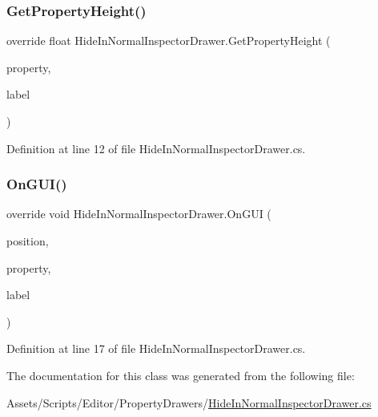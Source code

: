 \subsubsection{\texorpdfstring{Get\+Property\+Height()}{GetPropertyHeight()}}
{\footnotesize\ttfamily override float Hide\+In\+Normal\+Inspector\+Drawer.\+Get\+Property\+Height (\begin{DoxyParamCaption}\item[{Serialized\+Property}]{property,  }\item[{G\+U\+I\+Content}]{label }\end{DoxyParamCaption})}



Definition at line 12 of file Hide\+In\+Normal\+Inspector\+Drawer.\+cs.

\mbox{\label{class_hide_in_normal_inspector_drawer_a144ed49e4a5bf182e4ebc0e18fad2dcb}} 
\subsubsection{\texorpdfstring{On\+G\+U\+I()}{OnGUI()}}
{\footnotesize\ttfamily override void Hide\+In\+Normal\+Inspector\+Drawer.\+On\+G\+UI (\begin{DoxyParamCaption}\item[{Rect}]{position,  }\item[{Serialized\+Property}]{property,  }\item[{G\+U\+I\+Content}]{label }\end{DoxyParamCaption})}



Definition at line 17 of file Hide\+In\+Normal\+Inspector\+Drawer.\+cs.



The documentation for this class was generated from the following file\+:\begin{DoxyCompactItemize}
\item 
Assets/\+Scripts/\+Editor/\+Property\+Drawers/\mbox{\hyperlink{_hide_in_normal_inspector_drawer_8cs}{Hide\+In\+Normal\+Inspector\+Drawer.\+cs}}\end{DoxyCompactItemize}
